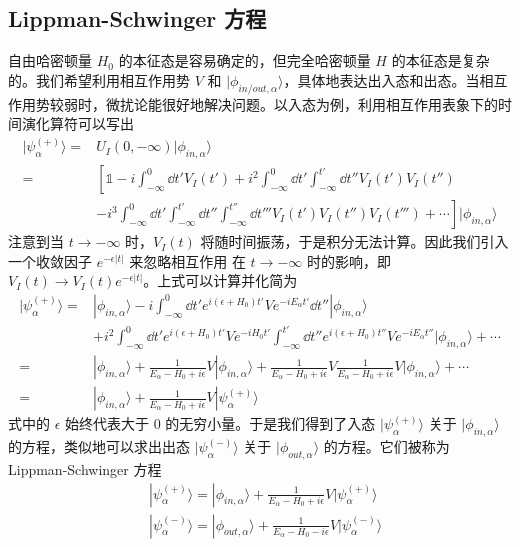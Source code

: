 \subsection{ Lippman-Schwinger 方程}
自由哈密顿量 $H_0$ 的本征态是容易确定的，但完全哈密顿量 $H$ 的本征态是复杂的。我们希望利用相互作用势 $V$ 和 $|\phi_{in/out,\alpha}\rangle$，具体地表达出入态和出态。当相互作用势较弱时，微扰论能很好地解决问题。以入态为例，利用相互作用表象下的时间演化算符可以写出
\begin{equation}
\begin{aligned}
|\psi_\alpha^{(+)}\rangle=&U_I(0,-\infty)|\phi_{in,\alpha}\rangle\\
=&\left[\mathbb{1}-i\int_{-\infty}^0 \dd t' V_I(t')+i^2\int_{-\infty}^0 \dd t'  \int_{-\infty}^{t'} \dd t'' V_I(t')V_I(t'')\right. \\
&\left.-i^3\int_{-\infty}^0 \dd t'  \int_{-\infty}^{t'} \dd t'' \int_{-\infty}^{t''}\dd t''' V_I(t')V_I(t'')V_I(t''')+\cdots\right]|\phi_{in,\alpha}\rangle
\end{aligned}
\end{equation}
注意到当 $t\rightarrow -\infty$ 时，$V_I(t)$ 将随时间振荡，于是积分无法计算。因此我们引入一个收敛因子 $e^{-\epsilon|t|}$ 来忽略相互作用 在 $t\rightarrow -\infty$ 时的影响，即 $V_I(t)\rightarrow V_I(t)e^{-\epsilon|t|}$。上式可以计算并化简为
\begin{equation}
\begin{aligned}
|\psi_\alpha^{(+)}\rangle=&|\phi_{in,\alpha}\rangle-i\int_{-\infty}^0 \dd t' e^{i(\epsilon+H_0) t'} V  e^{-iE_\alpha t'}\dd t''|\phi_{in,\alpha}\rangle \\
&+ i^2\int_{-\infty}^0 \dd t' e^{i(\epsilon+H_0)t'}V e^{-iH_0t'}  \int_{-\infty}^{t'}\dd t'' e^{i(\epsilon+H_0) t''} V e^{-iE_\alpha t''}|\phi_{in,\alpha}\rangle + \cdots\\
=&|\phi_{in,\alpha}\rangle+\frac{1}{E_\alpha-H_0+i\epsilon}V|\phi_{in,\alpha}\rangle+\frac{1}{E_\alpha-H_0+i\epsilon}V\frac{1}{E_\alpha-H_0+i\epsilon}V|\phi_{in,\alpha}\rangle
+\cdots\\
=&|\phi_{in,\alpha}\rangle+\frac{1}{E_\alpha-H_0+i\epsilon}V|\psi_\alpha^{(+)}\rangle
\end{aligned}
\end{equation}
式中的 $\epsilon$ 始终代表大于 $0$ 的无穷小量。于是我们得到了入态 $|\psi_\alpha^{(+)}\rangle$ 关于 $|\phi_{in,\alpha}\rangle$ 的方程，类似地可以求出出态 $|\psi_\alpha^{(-)}\rangle$ 关于 $|\phi_{out,\alpha}\rangle $ 的方程。它们被称为 Lippman-Schwinger 方程
\begin{equation}
\begin{aligned}
&|\psi_\alpha^{(+)}\rangle= |\phi_{in,\alpha}\rangle+\frac{1}{E_\alpha-H_0+i\epsilon}V|\psi_\alpha^{(+)}\rangle\\
&|\psi_\alpha^{(-)}\rangle= |\phi_{out,\alpha}\rangle+\frac{1}{E_\alpha-H_0-i\epsilon}V|\psi_\alpha^{(-)}\rangle
\end{aligned}
\end{equation}
